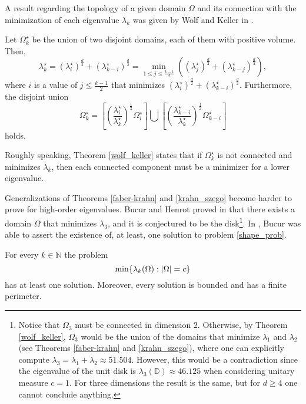A result regarding the topology of a given domain \(\Omega\) and its connection with the minimization of each eigenvalue \(\lambda_k\) was given by Wolf and Keller in \cite{wolf1994range}.
\begin{theorem}\label{wolf_keller}
    Let \(\Omega_k^\star\) be the union of two disjoint domains, each of them with positive volume. Then,
    \[
        \lambda_k^\star = (\lambda_i^\star)^\frac{d}{2} + (\lambda_{k-i}^\star)^\frac{d}{2} = \min_{1 \leq j \leq \frac{k-1}{2}}((\lambda_j^\star)^\frac{d}{2} + (\lambda_{k-j}^\star)^\frac{d}{2}),
    \]
    where \(i\) is a value of \(j \leq \frac{k-1}{2}\) that minimizes \(\left(\lambda_i^\star\right)^\frac{d}{2} + \left(\lambda_{k-i}^\star\right)^\frac{d}{2}\). Furthermore, the disjoint union
    \[
        \Omega_k^\star = \left[\left(\frac{\lambda_i^\star}{\lambda_k^\star}\right)^\frac{1}{2} \Omega_i^\star\right] \bigcup \left[\left(\frac{\lambda_{k-i}^\star}{\lambda_k^\star}\right)^\frac{1}{2} \Omega_{k-i}^\star \right]
    \]
    holds.
\end{theorem}
Roughly speaking, Theorem \ref{wolf_keller} states that if \(\Omega_k^\star\) is not connected and minimizes \(\lambda_k\), then each connected component must be a minimizer for a lower eigenvalue.

Generalizations of Theorems \eqref{faber-krahn} and \eqref{krahn_szego} become harder to prove for high-order eigenvalues. Bucur and Henrot proved in \cite{henrot2000minimization} that there exists a domain \(\Omega\) that minimizes \(\lambda_3\), and it is conjectured to be the disk\footnote{Notice that \(\Omega_3\) must be connected in dimension \(2\). Otherwise, by Theorem \ref{wolf_keller}, \(\Omega_3\) would be the union of the domains that minimize \(\lambda_1\) and \(\lambda_2\) (see Theorems \eqref{faber-krahn} and \eqref{krahn_szego}), where one can explicitly compute \(\lambda_3 = \lambda_1 + \lambda_2 \approx 51.504\). However, this would be a contradiction since the eigenvalue of the unit disk is \(\lambda_3(\mathbb{D}) \approx 46.125\) when considering unitary measure \(c=1\). For three dimensions the result is the same, but for \(d \geq 4\) one cannot conclude anything.}.
In \cite{bucur2012minimization}, Bucur was able to assert the existence of, at least, one solution to problem \eqref{shape_prob}.
\begin{theorem}[Bucur]
    For every \(k \in \mathbb{N}\) the problem
    \[
    \min\{\lambda_k(\Omega): \abs{\Omega} = c\}
    \]
    has at least one solution. Moreover, every solution is bounded and has a finite perimeter.
\end{theorem}

